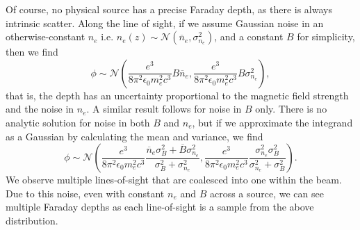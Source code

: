         Of course, no physical source has a precise Faraday depth, as there is always intrinsic scatter. Along the line of sight, if we assume Gaussian noise in an otherwise-constant $n_e$ i.e. $n_e(z) \sim \mathcal N(\overline n_e, \sigma_{n_e}^2)$, and a constant $B$ for simplicity, then we find
        \begin{equation}
            \phi \sim \mathcal N\left(\frac{e^3}{8\pi^2\epsilon_0m_e^2c^3} B \overline n_e, \frac{e^3}{8\pi^2\epsilon_0m_e^2c^3} B \sigma_{n_e}^2\right),
        \end{equation}
        that is, the depth has an uncertainty proportional to the magnetic field strength and the noise in $n_e$. A similar result follows for noise in $B$ only. There is no analytic solution for noise in both $B$ and $n_e$, but if we approximate the integrand as a Gaussian by calculating the mean and variance, we find
        \begin{equation}
            \phi \sim \mathcal N\left(\frac{e^3}{8\pi^2\epsilon_0m_e^2c^3} \frac{\overline n_e \sigma_B^2 + \overline B \sigma_{n_e}^2}{\sigma_B^2 + \sigma_{n_e}^2}, \frac{e^3}{8\pi^2\epsilon_0m_e^2c^3} \frac{\sigma_{n_e}^2 \sigma_B^2}{\sigma_{n_e}^2 + \sigma_B^2}\right).
        \end{equation}
        We observe multiple lines-of-sight that are coalesced into one within the beam. Due to this noise, even with constant $n_e$ and $B$ across a source, we can see multiple Faraday depths as each line-of-sight is a sample from the above distribution.




